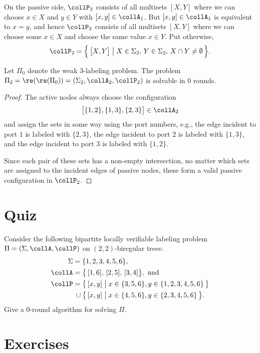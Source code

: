On the passive side, $\collP_2$ consists of all multisets $[X,Y]$ where we can choose $x \in X$ and $y \in Y$ with $[x,y] \in \collA_1$. But $[x,y] \in \collA_1$ is equivalent to $x = y$, and hence $\collP_2$ consists of all multisets $[X,Y]$ where we can choose some $x \in X$ and choose the same value $x \in Y$. Put otherwise,
\[
\collP_2 = \Bigl\{ \, \bigl[ X, Y \bigr] \bigm| X \in \Sigma_2,\, Y \in \Sigma_2,\, X \cap Y \ne \emptyset \,\Bigr\}.
\]

\begin{lemma}
	Let $\Pi_0$ denote the weak 3-labeling problem. The problem $\Pi_2 = \re(\re(\Pi_0)) = (\Sigma_2, \collA_2, \collP_2)$ is solvable in $0$ rounds.
\end{lemma}

\begin{proof}
	The active nodes always choose the configuration
	\[
	\bigl[\{ 1, 2 \}, \{ 1, 3 \}, \{ 2, 3 \} \bigr] \in \collA_2
	\]
	and assign the sets in some way using the port numbers, e.g., the edge incident to port $1$ is labeled with $\{2,3\}$, the edge incident to port $2$ is labeled with $\{1,3\}$, and the edge incident to port $3$ is labeled with $\{1,2\}$.

	Since each pair of these sets has a non-empty intersection, no matter which sets are assigned to the incident edges of passive nodes, these form a valid passive configuration in $\collP_2$.
\end{proof}

\section{Quiz}

Consider the following bipartite locally verifiable labeling problem $\Pi = (\Sigma, \collA, \collP)$ on $(2,2)$-biregular trees:
\begin{align*}
	\Sigma ={}& \{ 1, 2, 3, 4, 5, 6 \}, \\
	\collA ={}& \bigl\{\, [1, 6],\, [2, 5],\,[3, 4] \bigr\}, \text{ and} \\
	\collP ={}& \bigl\{\, [x, y] \bigm| x \in \{ 3, 5, 6 \}, y \in \{ 1, 2, 3, 4, 5, 6 \} \,\bigr\} \\
	  {}\cup{}& \bigl\{\, [x, y] \bigm| x \in \{4,5,6\}, y \in \{ 2, 3, 4, 5, 6 \} \,\bigr\}.
\end{align*}
Give a $0$-round algorithm for solving $\Pi$.

\section{Exercises}

